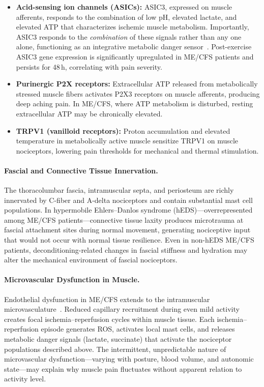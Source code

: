 \begin{itemize}
  \item \textbf{Acid-sensing ion channels (ASICs):} ASIC3, expressed on muscle afferents, responds to the combination of low pH, elevated lactate, and elevated ATP that characterizes ischemic muscle metabolism. Importantly, ASIC3 responds to the \emph{combination} of these signals rather than any one alone, functioning as an integrative metabolic danger sensor~\cite{Nijs2012painCFS}. Post-exercise ASIC3 gene expression is significantly upregulated in ME/CFS patients and persists for 48\,h, correlating with pain severity.
  \item \textbf{Purinergic P2X receptors:} Extracellular ATP released from metabolically stressed muscle fibers activates P2X3 receptors on muscle afferents, producing deep aching pain. In ME/CFS, where ATP metabolism is disturbed, resting extracellular ATP may be chronically elevated.
  \item \textbf{TRPV1 (vanilloid receptors):} Proton accumulation and elevated temperature in metabolically active muscle sensitize TRPV1 on muscle nociceptors, lowering pain thresholds for mechanical and thermal stimulation.
\end{itemize}

\paragraph{Fascial and Connective Tissue Innervation.}
The thoracolumbar fascia, intramuscular septa, and periosteum are richly innervated by C-fiber and A-delta nociceptors and contain substantial mast cell populations. In hypermobile Ehlers--Danlos syndrome (hEDS)---overrepresented among ME/CFS patients---connective tissue laxity produces microtrauma at fascial attachment sites during normal movement, generating nociceptive input that would not occur with normal tissue resilience. Even in non-hEDS ME/CFS patients, deconditioning-related changes in fascial stiffness and hydration may alter the mechanical environment of fascial nociceptors.

\paragraph{Microvascular Dysfunction in Muscle.}
Endothelial dysfunction in ME/CFS extends to the intramuscular microvasculature~\cite{heng2025mecfs}. Reduced capillary recruitment during even mild activity creates focal ischemia--reperfusion cycles within muscle tissue. Each ischemia--reperfusion episode generates ROS, activates local mast cells, and releases metabolic danger signals (lactate, succinate) that activate the nociceptor populations described above. The intermittent, unpredictable nature of microvascular dysfunction---varying with posture, blood volume, and autonomic state---may explain why muscle pain fluctuates without apparent relation to activity level.

